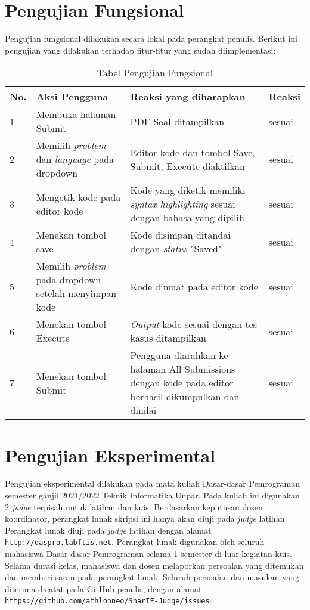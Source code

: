 \section{Pengujian Fungsional}
\label{sec:5:fungsional}

Pengujian fungsional dilakukan secara lokal pada perangkat penulis. Berikut ini pengujian yang dilakukan terhadap fitur-fitur yang sudah diimplementasi:

\begin{table}[H]
	\centering
	\caption{Tabel Pengujian Fungsional}
	\begin{tabular}{|p{0.5cm}| p{5.5cm}| p{6cm}| p{2.5cm}|} \hline
	No.	&	Aksi Pengguna	&	Reaksi yang diharapkan	&	Reaksi \\ \hline
	1 	&  Membuka halaman Submit & PDF Soal ditampilkan &	sesuai	\\ \hline
	2 	&  Memilih \textit{problem} dan \textit{language} pada dropdown & Editor kode dan tombol Save, Submit, Execute diaktifkan &	sesuai	\\ \hline
	3 	&  Mengetik kode pada editor kode & Kode yang diketik memiliki \textit{syntax highlighting} sesuai dengan bahasa yang dipilih &	sesuai	\\ \hline
	4 	&  Menekan tombol save & Kode disimpan ditandai dengan \textit{status} "Saved" &	sesuai	\\ \hline
	5 	&  Memilih \textit{problem} pada dropdown setelah menyimpan kode & Kode dimuat pada editor kode &	sesuai	\\ \hline
	6 	&  Menekan tombol Execute & \textit{Output} kode sesuai dengan tes kasus ditampilkan &	sesuai	\\ \hline
	7 	&  Menekan tombol Submit & Pengguna diarahkan ke halaman All Submissions dengan kode pada editor berhasil dikumpulkan dan dinilai  &	sesuai	\\ \hline
	\end{tabular}
	\label{table:fungsional}
\end{table}


\section{Pengujian Eksperimental}
\label{sec:5:eksperimental}

Pengujian eksperimental dilakukan pada mata kuliah Dasar-dasar Pemrograman semester ganjil 2021/2022 Teknik Informatika Unpar. Pada kuliah ini digunakan 2 \textit{judge} terpisah untuk latihan dan kuis. Berdasarkan keputusan dosen koordinator, perangkat lunak skripsi ini hanya akan diuji pada \textit{judge} latihan. Perangkat lunak diuji pada \textit{judge} latihan dengan alamat \verb|http://daspro.labftis.net|. 
Perangkat lunak digunakan oleh seluruh mahasiswa Dasar-dasar Pemrograman selama 1 semester di luar kegiatan kuis. Selama durasi kelas, mahasiswa dan dosen melaporkan persoalan yang ditemukan dan memberi saran pada perangkat lunak. Seluruh persoalan dan masukan yang diterima dicatat pada GitHub penulis, dengan alamat \verb|https://github.com/athlonneo/SharIF-Judge/issues|.

